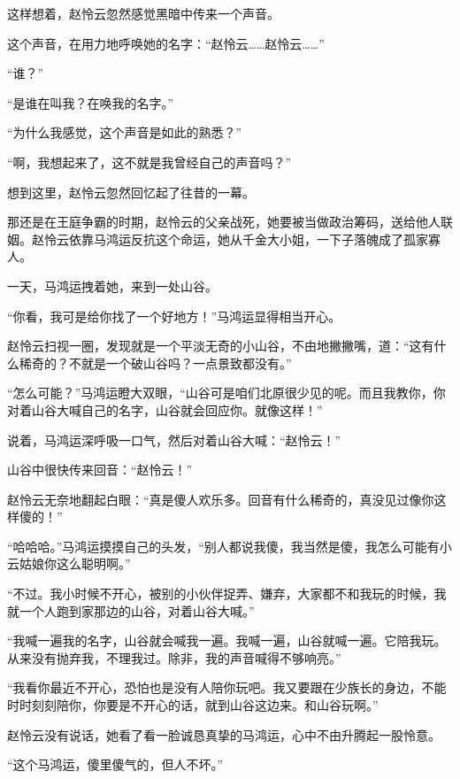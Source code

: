 
\begin{this_body}



这样想着，赵怜云忽然感觉黑暗中传来一个声音。

这个声音，在用力地呼唤她的名字：“赵怜云……赵怜云……”

“谁？”

“是谁在叫我？在唤我的名字。”

“为什么我感觉，这个声音是如此的熟悉？”

“啊，我想起来了，这不就是我曾经自己的声音吗？”

想到这里，赵怜云忽然回忆起了往昔的一幕。

那还是在王庭争霸的时期，赵怜云的父亲战死，她要被当做政治筹码，送给他人联姻。赵怜云依靠马鸿运反抗这个命运，她从千金大小姐，一下子落魄成了孤家寡人。

一天，马鸿运拽着她，来到一处山谷。

“你看，我可是给你找了一个好地方！”马鸿运显得相当开心。

赵怜云扫视一圈，发现就是一个平淡无奇的小山谷，不由地撇撇嘴，道：“这有什么稀奇的？不就是一个破山谷吗？一点景致都没有。”

“怎么可能？”马鸿运瞪大双眼，“山谷可是咱们北原很少见的呢。而且我教你，你对着山谷大喊自己的名字，山谷就会回应你。就像这样！”

说着，马鸿运深呼吸一口气，然后对着山谷大喊：“赵怜云！”

山谷中很快传来回音：“赵怜云！”

赵怜云无奈地翻起白眼：“真是傻人欢乐多。回音有什么稀奇的，真没见过像你这样傻的！”

“哈哈哈。”马鸿运摸摸自己的头发，“别人都说我傻，我当然是傻，我怎么可能有小云姑娘你这么聪明啊。”

“不过。我小时候不开心，被别的小伙伴捉弄、嫌弃，大家都不和我玩的时候，我就一个人跑到家那边的山谷，对着山谷大喊。”

“我喊一遍我的名字，山谷就会喊我一遍。我喊一遍，山谷就喊一遍。它陪我玩。从来没有抛弃我，不理我过。除非，我的声音喊得不够响亮。”

“我看你最近不开心，恐怕也是没有人陪你玩吧。我又要跟在少族长的身边，不能时时刻刻陪你，你要是不开心的话，就到山谷这边来。和山谷玩啊。”

赵怜云没有说话，她看了看一脸诚恳真挚的马鸿运，心中不由升腾起一股怜意。

“这个马鸿运，傻里傻气的，但人不坏。”


\end{this_body}
